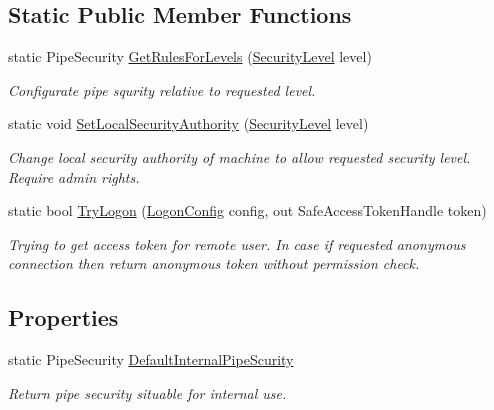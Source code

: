 \subsection*{Static Public Member Functions}
\begin{DoxyCompactItemize}
\item 
static Pipe\+Security \mbox{\hyperlink{class_pipes_provider_1_1_security_1_1_general_a7b89c9d059851b68df31b78c1a2e021c}{Get\+Rules\+For\+Levels}} (\mbox{\hyperlink{namespace_pipes_provider_1_1_security_a1a6020eca1c661a6f7140e8260502d7e}{Security\+Level}} level)
\begin{DoxyCompactList}\small\item\em Configurate pipe squrity relative to requested level. \end{DoxyCompactList}\item 
static void \mbox{\hyperlink{class_pipes_provider_1_1_security_1_1_general_a9536a3073883f12e38979f54c6f389d1}{Set\+Local\+Security\+Authority}} (\mbox{\hyperlink{namespace_pipes_provider_1_1_security_a1a6020eca1c661a6f7140e8260502d7e}{Security\+Level}} level)
\begin{DoxyCompactList}\small\item\em Change local security authority of machine to allow requested security level. Require admin rights. \end{DoxyCompactList}\item 
static bool \mbox{\hyperlink{class_pipes_provider_1_1_security_1_1_general_ab72cbd58c62e331b7602c6f99ad7cf54}{Try\+Logon}} (\mbox{\hyperlink{struct_pipes_provider_1_1_security_1_1_logon_config}{Logon\+Config}} config, out Safe\+Access\+Token\+Handle token)
\begin{DoxyCompactList}\small\item\em Trying to get access token for remote user. In case if requested anonymous connection then return anonymous token without permission check. \end{DoxyCompactList}\end{DoxyCompactItemize}
\subsection*{Properties}
\begin{DoxyCompactItemize}
\item 
static Pipe\+Security \mbox{\hyperlink{class_pipes_provider_1_1_security_1_1_general_a49b6c46c031ae200885fcababfdb32c3}{Default\+Internal\+Pipe\+Scurity}}
\begin{DoxyCompactList}\small\item\em Return pipe security situable for internal use. \end{DoxyCompactList}\end{DoxyCompactItemize}


